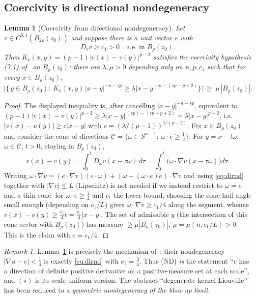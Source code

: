 \documentclass[11pt]{amsart}
\theoremstyle{plain}
\newtheorem{lemma}[theorem]{Lemma}
\theoremstyle{definition}
\theoremstyle{remark}
\newtheorem{remark}[theorem]{Remark}
\begin{document}
\subsection{Coercivity is directional nondegeneracy}
\begin{lemma}[Coercivity from directional nondegeneracy]\label{lem:coerc}
Let $v\in C^{0,1}(B_{2\rho}(z_0))$ and suppose there is a unit vector $e$ with
\begin{equation}\label{eq:dirnd}
  D_e v\ge c_1>0\quad\text{a.e.\ in }B_{\rho}(z_0).
\end{equation}
Then $K_v(x,y)=(p-1)|v(x)-v(y)|^{p-2}$ satisfies the coercivity hypothesis
\textnormal{(7.1)} of~\cite[Thm 7.3]{GJS} on $B_\rho(z_0)$: there are
$\lambda,\mu>0$ depending only on $n,p,c_1$ such that for every
$x\in B_\rho(z_0)$,
\[
  \Big|\Big\{\,y\in B_\rho(z_0):\ K_v(x,y)\,|x-y|^{-n-sp}\ge\lambda|x-y|^{-n-(sp-p+2)}\Big\}\Big|
   \ \ge\ \mu\,|B_\rho(z_0)| .
\]
\end{lemma}
\begin{proof}
The displayed inequality is, after cancelling $|x-y|^{-n-sp}$, equivalent to
$(p-1)|v(x)-v(y)|^{p-2}\ge\lambda|x-y|^{\,(sp)-(sp-p+2)}=\lambda|x-y|^{p-2}$,
i.e.\ $|v(x)-v(y)|\ge c|x-y|$ with $c=(\lambda/(p-1))^{1/(p-2)}$. Fix
$x\in B_\rho(z_0)$ and consider the cone of directions
$\mathcal C=\{\omega\in S^{n-1}:\ \omega\cdot e\ge\tfrac12\}$. For
$y=x-t\omega$, $\omega\in\mathcal C$, $t>0$, staying in $B_\rho(z_0)$,
\[
  v(x)-v(y)=\int_0^t D_\omega v(x-\tau\omega)\,d\tau
   =\int_0^t\big(\omega\cdot\nabla v(x-\tau\omega)\big)d\tau .
\]
Writing $\omega\cdot\nabla v=(e\cdot\nabla v)(e\cdot\omega)+(\omega-(\omega\cdot e)e)\cdot\nabla v$
and using \eqref{eq:dirnd} together with $|\nabla v|\le L$ (Lipschitz) is not
needed if we instead restrict to $\omega=e$ and a thin cone: for
$\omega\cdot e\ge\tfrac12$ and $c_1$ the lower bound, choosing the cone
half-angle small enough (depending on $c_1/L$) gives $\omega\cdot\nabla v\ge
c_1/4$ along the segment, whence $v(x)-v(y)\ge\frac{c_1}{4}t=\frac{c_1}{4}|x-y|$.
The set of admissible $y$ (the intersection of this cone-sector with
$B_\rho(z_0)$) has measure $\ge\mu|B_\rho(z_0)|$, $\mu=\mu(n,c_1/L)>0$. This is
the claim with $c=c_1/4$.
\end{proof}

\begin{remark}\label{rem:coerc}
Lemma~\ref{lem:coerc} is precisely the mechanism of~\cite[\S6]{GJS}: their
nondegeneracy $|\nabla u-e|<\tfrac14$ is exactly \eqref{eq:dirnd} with
$c_1=\tfrac34$. Thus \textnormal{(ND)} \emph{is} the statement ``$v$ has a
direction of definite positive derivative on a positive-measure set at each
scale'', and $(\star)$ is its scale-uniform version. The abstract
``degenerate-kernel Liouville'' has been reduced to a \emph{geometric
nondegeneracy of the blow-up limit}.
\end{remark}
\end{document}
